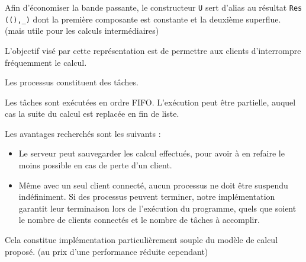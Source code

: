 \documentclass[11pt]{article}
\begin{document}
Afin d'\'economiser la bande passante,
le constructeur {\tt U} sert d'alias au r\'esultat {\tt Res ((),\_)}
dont la premi\`ere composante est constante et la deuxi\`eme superflue.
(mais utile pour les calculs interm\'ediaires)

\smallskip

L'objectif vis\'e par cette repr\'esentation est
de permettre aux clients d'interrompre fr\'equemment le calcul.

Les processus constituent des t\^aches.

Les t\^aches sont ex\'ecut\'ees en ordre FIFO.
L'ex\'ecution peut \^etre partielle,
auquel cas la suite du calcul est replac\'ee en fin de liste.

\smallskip

Les avantages recherch\'es sont les suivants :

\begin{itemize}
  \item Le serveur peut sauvegarder les calcul effectu\'es,
    pour avoir \`a en refaire le moins possible en cas de perte d'un client.
  \item M\^eme avec un seul client connect\'e,
    aucun processus ne doit \^etre suspendu ind\'efiniment.
    Si des processus peuvent terminer, notre impl\'ementation garantit leur
    terminaison lors de l'ex\'ecution du programme, quels que soient
    le nombre de clients connect\'es et le nombre de t\^aches \`a accomplir.
\end{itemize}

Cela constitue impl\'ementation particuli\`erement souple
du mod\`ele de calcul propos\'e.
(au prix d'une performance r\'eduite cependant)
\end{document}
